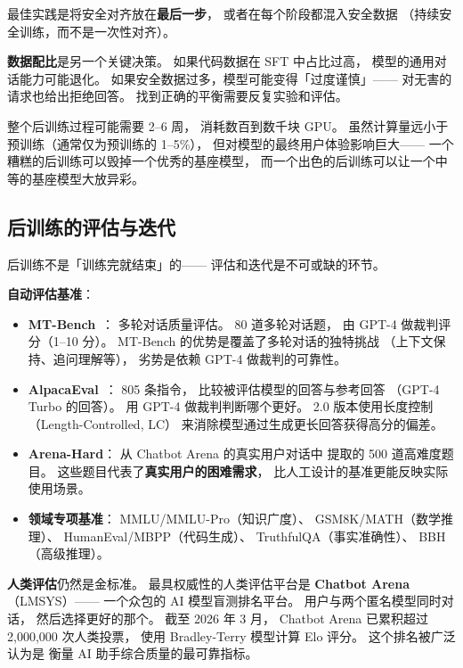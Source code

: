 最佳实践是将安全对齐放在\textbf{最后一步}，
或者在每个阶段都混入安全数据
（持续安全训练，而不是一次性对齐）。

\textbf{数据配比}是另一个关键决策。
如果代码数据在 SFT 中占比过高，
模型的通用对话能力可能退化。
如果安全数据过多，模型可能变得「过度谨慎」——
对无害的请求也给出拒绝回答。
找到正确的平衡需要反复实验和评估。

整个后训练过程可能需要 2--6 周，
消耗数百到数千块 GPU。
虽然计算量远小于预训练（通常仅为预训练的 1--5\%），
但对模型的最终用户体验影响巨大——
一个糟糕的后训练可以毁掉一个优秀的基座模型，
而一个出色的后训练可以让一个中等的基座模型大放异彩。

\subsection{后训练的评估与迭代}

后训练不是「训练完就结束」的——
评估和迭代是不可或缺的环节。

\textbf{自动评估基准}：
\begin{itemize}[noitemsep]
  \item \textbf{MT-Bench}~\cite{zheng2023mtbench}：
        多轮对话质量评估。
        80 道多轮对话题，
        由 GPT-4 做裁判评分（1--10 分）。
        MT-Bench 的优势是覆盖了多轮对话的独特挑战
       （上下文保持、追问理解等），
        劣势是依赖 GPT-4 做裁判的可靠性。
  \item \textbf{AlpacaEval}~\cite{li2023alpacaeval}：
        805 条指令，
        比较被评估模型的回答与参考回答
       （GPT-4 Turbo 的回答）。
        用 GPT-4 做裁判判断哪个更好。
        2.0 版本使用长度控制（Length-Controlled, LC）
        来消除模型通过生成更长回答获得高分的偏差。
  \item \textbf{Arena-Hard}：
        从 Chatbot Arena 的真实用户对话中
        提取的 500 道高难度题目。
        这些题目代表了\textbf{真实用户的困难需求}，
        比人工设计的基准更能反映实际使用场景。
  \item \textbf{领域专项基准}：
        MMLU/MMLU-Pro（知识广度）、
        GSM8K/MATH（数学推理）、
        HumanEval/MBPP（代码生成）、
        TruthfulQA（事实准确性）、
        BBH（高级推理）。
\end{itemize}

\textbf{人类评估}仍然是金标准。
最具权威性的人类评估平台是
\textbf{Chatbot Arena}（LMSYS）——
一个众包的 AI 模型盲测排名平台。
用户与两个匿名模型同时对话，
然后选择更好的那个。
截至 2026 年 3 月，
Chatbot Arena 已累积超过 2,000,000 次人类投票，
使用 Bradley-Terry 模型计算 Elo 评分。
这个排名被广泛认为是
衡量 AI 助手综合质量的最可靠指标。

